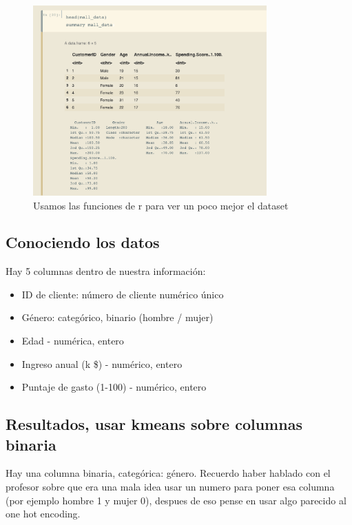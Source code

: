 \documentclass[12pt, fleqn]{report}                             %
\theoremstyle{break}                                            %
\begin{document}
        \begin{figure}[h!]
            \centering
            \includegraphics[width=0.8\textwidth]{3}
            \caption{Usamos las funciones de r para ver un poco mejor el dataset}
        \end{figure}

        \clearpage

        \subsection{Conociendo los datos}

        Hay 5 columnas dentro de nuestra información:

        \begin{itemize}
            \item ID de cliente: número de cliente numérico único
            \item Género: categórico, binario (hombre / mujer)
            \item Edad - numérica, entero
            \item Ingreso anual (k \$) - numérico, entero
            \item Puntaje de gasto (1-100) - numérico, entero
        \end{itemize}

        \subsection{Resultados, usar kmeans sobre columnas binaria}

        Hay una columna binaria, categórica: género.
        Recuerdo haber hablado con el profesor sobre que era una mala idea usar un numero para poner esa columna
        (por ejemplo hombre 1 y mujer 0), despues de eso pense en usar algo parecido al one hot encoding.
        
\end{document}
